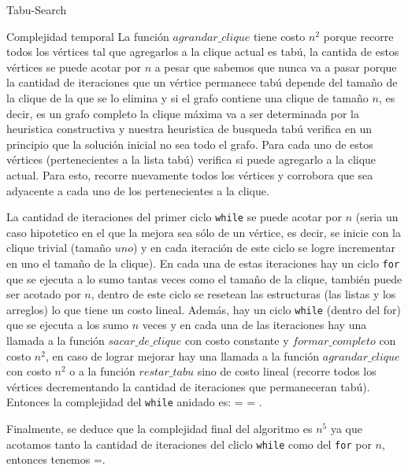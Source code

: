 \begin{section}{Tabu-Search}
\begin{subsection}{Complejidad temporal}
			La función $agrandar\_clique$ tiene costo $n^2$ porque recorre todos los vértices tal que agregarlos a la clique actual es tabú, la cantida de estos vértices se puede acotar por $n$ a pesar que sabemos que nunca va a pasar porque la cantidad de iteraciones que un vértice permanece tabú depende del tamaño de la clique de la que se lo elimina y si el grafo contiene una clique de tamaño $n$, es decir, es un grafo completo la clique máxima va a ser determinada por la heuristica constructiva y nuestra heuristica de busqueda tabú verifica en un principio que la solución inicial no sea todo el grafo. Para cada uno de estos vértices (pertenecientes a la lista tabú) verifica si puede agregarlo a la clique actual. Para esto, recorre nuevamente todos los vértices y corrobora que sea adyacente a cada uno de los pertenecientes a la clique.

			 La cantidad de iteraciones del primer ciclo \texttt{while} se puede acotar por $n$ (seria un caso hipotetico en el que la mejora sea sólo de un vértice, es decir, se inicie con la clique trivial (tamaño $uno$) y en cada iteración de este ciclo se logre incrementar en uno el tamaño de la clique). En cada una de estas iteraciones hay un ciclo \texttt{for} que se ejecuta a lo sumo tantas veces como el tamaño de la clique, también puede ser acotado por $n$, dentro de este ciclo se resetean las estructuras (las listas y los arreglos) lo que tiene un costo lineal. Además, hay un ciclo \texttt{while} (dentro del for) que se ejecuta a los sumo $n$ veces y en cada una de las iteraciones hay una llamada a la función $sacar\_de\_clique$ con costo constante y $formar\_completo$ con costo $n^2$, en caso de lograr mejorar hay una llamada a la función $agrandar\_clique$ con costo $n^2$ o a la función $restar\_tabu$ sino de costo lineal (recorre todos los vértices decrementando la cantidad de iteraciones que permaneceran tabú). Entonces la complejidad del \texttt{while} anidado es:   =  = .

			 Finalmente, se deduce que la complejidad final del algoritmo es $n^5$ ya que acotamos tanto la cantidad de iteraciones del cliclo \texttt{while} como del \texttt{for} por $n$, entonces tenemos =.
	\end{subsection}

\end{section}
